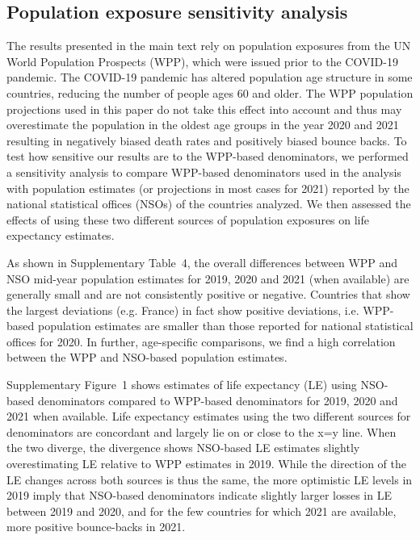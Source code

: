 \documentclass[12pt]{article}
\begin{document}
\subsection*{Population exposure sensitivity analysis}

The results presented in the main text rely on population exposures from the UN World Population Prospects (WPP), which were issued prior to the COVID-19 pandemic. The COVID-19 pandemic has altered population age structure in some countries, reducing the number of people ages 60 and older. The WPP population projections used in this paper do not take this effect into account and thus may overestimate the population in the oldest age groups in the year 2020 and 2021 resulting in negatively biased death rates and positively biased bounce backs. To test how sensitive our results are to the WPP-based denominators, we performed a sensitivity analysis to compare WPP-based denominators used in the analysis with population estimates (or projections in most cases for 2021) reported by the national statistical offices (NSOs) of the countries analyzed. We then assessed the effects of using these two different sources of population exposures on life expectancy estimates.

As shown in Supplementary Table~4, the overall differences between WPP and NSO mid-year population estimates for 2019, 2020 and 2021 (when available) are generally small and are not consistently positive or negative. Countries that show the largest deviations (e.g. France) in fact show positive deviations, i.e. WPP-based population estimates are smaller than those reported for national statistical offices for 2020. In further, age-specific comparisons, we find a high correlation between the WPP and NSO-based population estimates.

Supplementary Figure~1 shows estimates of life expectancy (LE) using NSO-based denominators compared to WPP-based denominators for 2019, 2020 and 2021 when available. Life expectancy estimates using the two different sources for denominators are concordant and largely lie on or close to the x=y line. When the two diverge, the divergence shows NSO-based LE estimates slightly overestimating LE relative to WPP estimates in 2019. While the direction of the LE changes across both sources is thus the same, the more optimistic LE levels in 2019 imply that NSO-based denominators indicate slightly larger losses in LE between 2019 and 2020, and for the few countries for which 2021 are available, more positive bounce-backs in 2021.
\end{document}
